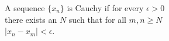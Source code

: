 \documentclass[preview]{standalone}
\begin{document}
\begin{center}
A sequence $\{x_n\}$ is Cauchy if for every $\epsilon > 0$\\there exists an $N$ such that for all $m, n \geq N$\\$\left| x_n - x_m \right| < \epsilon$.
\end{center}
\end{document}
